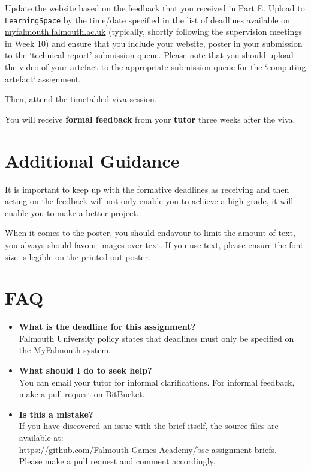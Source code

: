 \documentclass{../../fal_assignment}
\begin{document}
Update the website based on the feedback that you received in Part E. Upload to \texttt{LearningSpace} by the time/date specified in the list of deadlines available on \url{myfalmouth.falmouth.ac.uk} (typically, shortly following the supervision meetings in Week 10) and ensure that you include your website, poster in your submission to the `technical report' submission queue. Please note that you should upload the video of your artefact to the appropriate submission queue for the `computing artefact` assignment. 

Then, attend the timetabled viva session.

You will receive \textbf{formal feedback} from your \textbf{tutor} three weeks after the viva.

\section*{Additional Guidance}

It is important to keep up with the formative deadlines as receiving and then
acting on the feedback will not only enable you to achieve a high grade, it
will enable you to make a better project.

When it comes to the poster, you should endavour to limit the amount of text,
you always should favour images over text. If you use text, please ensure the
font size is legible on the printed out poster.

\section*{FAQ}

\begin{itemize}
	\item 	\textbf{What is the deadline for this assignment?} \\ 
    		Falmouth University policy states that deadlines must only be specified on the MyFalmouth system.
    		
	\item 	\textbf{What should I do to seek help?} \\ 
    		You can email your tutor for informal clarifications. For informal feedback, make a pull request on BitBucket. 
    		
    	\item 	\textbf{Is this a mistake?} \\ 	
    		If you have discovered an issue with the brief itself, the source files are available at: \\
    		\url{https://github.com/Falmouth-Games-Academy/bsc-assignment-briefs}.\\
    		 Please make a pull request and comment accordingly.
\end{itemize}
\end{document}
